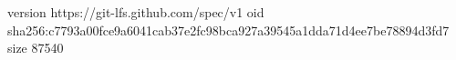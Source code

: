 version https://git-lfs.github.com/spec/v1
oid sha256:c7793a00fce9a6041cab37e2fc98bca927a39545a1dda71d4ee7be78894d3fd7
size 87540
